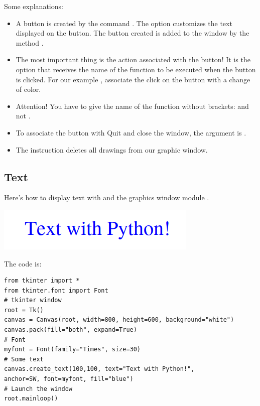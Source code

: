 \documentclass[11pt,class=report,crop=false]{standalone}
\begin{document}
Some explanations:
\begin{itemize}
  \item A button is created by the command . The  option customizes the text displayed on the button. The button created is added to the window by the method .
  \item The most important thing is the action associated with the button! It is the option  that receives the name of the function to be executed when the button is clicked. For our example , associate the click on the button with a change of color.
  
  \item Attention! You have to give the name of the function without brackets:  and not .
  
  \item To associate the button with \og{}Quit\fg{} and close the window, the argument is .
  
  \item The instruction  deletes all drawings from our graphic window.
  
\end{itemize}

\subsection{Text}

Here's how to display text with \Python{} and the graphics window module 
.

\begin{center}
\includegraphics[scale=0.6]{../markdown/screen-markdown-7-en}
\end{center}
The code is:
\begin{lstlisting}
from tkinter import *
from tkinter.font import Font
# tkinter window
root = Tk()  
canvas = Canvas(root, width=800, height=600, background="white")
canvas.pack(fill="both", expand=True)
# Font
myfont = Font(family="Times", size=30)
# Some text
canvas.create_text(100,100, text="Text with Python!", 
anchor=SW, font=myfont, fill="blue")
# Launch the window
root.mainloop()
\end{lstlisting}
\end{document}
